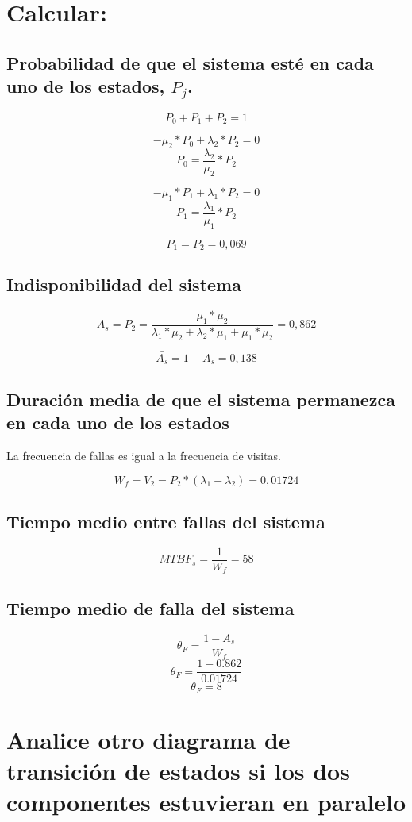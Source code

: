 \documentclass[
    11pt,
    spanish,
    a4paper
]{article}
\begin{document}
\section{Calcular:}

\subsection{Probabilidad de que el sistema esté en cada uno de los estados, $P_j$.}

$$ P_0 + P_1 + P_2 = 1 $$

$$ -\mu_2 * P_0 + \lambda_2 * P_2 = 0 $$
$$ P_0 = \frac{\lambda_2}{\mu_2} * P_2 $$

$$ -\mu_1 * P_1 + \lambda_1 * P_2 = 0 $$
$$ P_1 = \frac{\lambda_1}{\mu_1} * P_2 $$

$$ P_1 = P_2 = 0,069 $$

\subsection{Indisponibilidad del sistema}

$$ A_s = P_2 = \frac{\mu_1*\mu_2}{\lambda_1*\mu_2+\lambda_2*\mu_1+\mu_1*\mu_2} = 0,862 $$

$$ \bar{A_s} = 1 - A_s = 0,138 $$

\subsection{Duración media de que el sistema permanezca en cada uno de los estados}

La frecuencia de fallas es igual a la frecuencia de visitas.

$$ W_f = V_2 = P_2 * (\lambda_1 + \lambda_2) = 0,01724 $$

\subsection{Tiempo medio entre fallas del sistema}

$$ MTBF_s = \frac{1}{W_f} = 58 $$

\subsection{Tiempo medio de falla del sistema}

$$ \theta_F = \frac{1 - A_s}{W_f} $$
$$ \theta_F = \frac{1 - 0.862}{0.01724} $$
$$ \theta_F = 8 $$

\section{Analice otro diagrama de transición de estados si los dos componentes estuvieran en paralelo}
\end{document}
